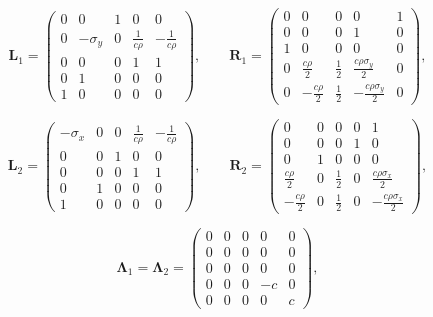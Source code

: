 \begin{equation*}
    \pmb{L}_1 = \begin{pmatrix}
        0 & 0 & 1 & 0 & 0 \\
        0 & -\sigma_y & 0 & \frac{1}{c \rho} & -\frac{1}{c \rho} \\
        0 & 0 & 0 & 1 & 1 \\
        0 & 1 & 0 & 0 & 0 \\
        1 & 0 & 0 & 0 & 0
    \end{pmatrix} , \qquad
    \pmb{R}_1 = \begin{pmatrix}
        0 & 0 & 0 & 0 & 1 \\
        0 & 0 & 0 & 1 & 0 \\
        1 & 0 & 0 & 0 & 0 \\
        0 & \frac{c \rho}{2} & \frac{1}{2} & \frac{c \rho \sigma_y}{2} & 0  \\
        0 & -\frac{c \rho}{2}  & \frac{1}{2} & - \frac{c \rho \sigma_y}{2} & 0
    \end{pmatrix} ,
\end{equation*}
    
\begin{equation*}
    \pmb{L}_2 = \begin{pmatrix}
        -\sigma_x & 0 & 0 & \frac{1}{c \rho} & -\frac{1}{c \rho} \\
        0 & 0 & 1 & 0 & 0 \\
        0 & 0 & 0 & 1 & 1 \\
        0 & 1 & 0 & 0 & 0 \\
        1 & 0 & 0 & 0 & 0
    \end{pmatrix} , \qquad
    \pmb{R}_2 = \begin{pmatrix}
        0 & 0 & 0 & 0 & 1 \\
        0 & 0 & 0 & 1 & 0 \\
        0 & 1 & 0 & 0 & 0 \\
        \frac{c \rho}{2} & 0 & \frac{1}{2} & 0 & \frac{c \rho \sigma_x}{2}  \\
        -\frac{c \rho}{2} & 0 & \frac{1}{2} & 0 & - \frac{c \rho \sigma_x}{2} 
    \end{pmatrix} ,
\end{equation*}

\begin{equation*}
    \pmb{\Lambda}_1 = \pmb{\Lambda}_2 = \begin{pmatrix}
        0 & 0 & 0 & 0 & 0 \\
        0 & 0 & 0 & 0 & 0 \\
        0 & 0 & 0 & 0 & 0 \\
        0 & 0 & 0 & -c & 0 \\
        0 & 0 & 0 & 0 & c
    \end{pmatrix} ,
\end{equation*}

